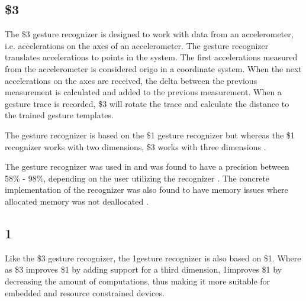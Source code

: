 


\subsection{\$3}

The \$3 gesture recognizer is designed to work with data from an accelerometer, i.e. accelerations on the axes of an accelerometer. The gesture recognizer translates accelerations to points in the system. The first accelerations measured from the accelerometer is considered origo in a coordinate system. When the next accelerations on the axes are received, the delta between the previous measurement is calculated and added to the previous measurement. When a gesture trace is recorded, \$3 will rotate the trace and calculate the distance to the trained gesture templates.

The gesture recognizer is based on the \$1 gesture recognizer but whereas the \$1 recognizer works with two dimensions, \$3 works with three dimensions \cite{threedollar}.

The gesture recognizer was used in \cite{prespecialisation} and was found to have a precision between 58\% - 98\%, depending on the user utilizing the recognizer \cite[p. 55]{prespecialisation}. The concrete implementation of the recognizer was also found to have memory issues where allocated memory was not deallocated \cite[p. 54]{prespecialisation}.

\subsection{1\textcent}

Like the \$3 gesture recognizer, the 1\textcent gesture recognizer is also based on \$1. Where as \$3 improves \$1 by adding support for a third dimension, 1\textcent improves \$1 by decreasing the amount of computations, thus making it more suitable for embedded and resource constrained devices.

